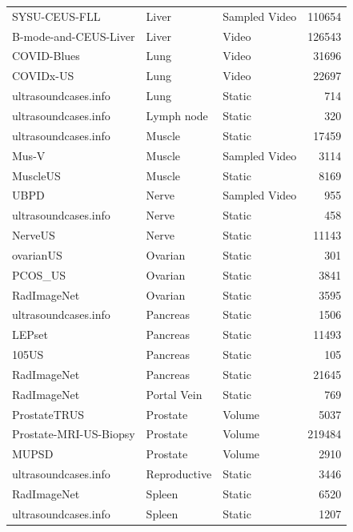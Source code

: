 \documentclass{article}
\theoremstyle{plain}
\theoremstyle{definition}
\theoremstyle{remark}
\begin{document}
\begin{small}
\begin{center}
\begin{sc}
\begin{longtable}{lllr}
SYSU-CEUS-FLL \cite{liang_recognizing_2014} & Liver & Sampled Video & 110654 \\
B-mode-and-CEUS-Liver \cite{eisenbrey_ultrasound_2021} & Liver & Video & 126543 \\
COVID-Blues \cite{Born2021AcceleratingAnalysis} & Lung & Video & 31696 \\
COVIDx-US \cite{ebadi_covidx-us_2022} & Lung & Video & 22697 \\
ultrasoundcases.info & Lung & Static & 714 \\
ultrasoundcases.info & Lymph node & Static & 320 \\
ultrasoundcases.info & Muscle & Static & 17459 \\
Mus-V \cite{geng_force_2024} & Muscle & Sampled Video & 3114 \\
MuscleUS \cite{meiburger_dataset_2021} & Muscle & Static & 8169 \\
UBPD \cite{ding_mallesnet_2022} & Nerve & Sampled Video & 955 \\
ultrasoundcases.info & Nerve & Static & 458 \\
NerveUS \cite{ultrasound-nerve-segmentation} & Nerve & Static & 11143 \\
ovarianUS \cite{borna_ai-powered_2025} & Ovarian & Static & 301 \\
PCOS\_US \cite{choudhari_pcos_nodate} & Ovarian & Static & 3841 \\
RadImageNet & Ovarian & Static & 3595 \\
ultrasoundcases.info & Pancreas & Static & 1506 \\
LEPset \cite{li_lepset_2023} & Pancreas & Static & 11493 \\
105US \cite{hann_algorithm_2017} & Pancreas & Static & 105 \\
RadImageNet & Pancreas & Static & 21645 \\
RadImageNet & Portal Vein & Static & 769 \\
ProstateTRUS \cite{baum_mr_2023} & Prostate & Volume & 5037 \\
Prostate-MRI-US-Biopsy \cite{natarajan_prostate_2020} & Prostate & Volume & 219484 \\
MUPSD \cite{shao_micro-ultrasound_2024} & Prostate & Volume & 2910 \\
ultrasoundcases.info & Reproductive & Static & 3446 \\
RadImageNet & Spleen & Static & 6520 \\
ultrasoundcases.info & Spleen & Static & 1207 \\

\end{longtable}
\end{sc}
\end{center}
\end{small}
\end{document}
